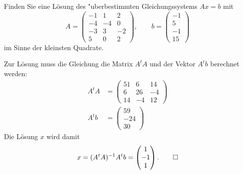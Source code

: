 Finden Sie eine Lösung des "uberbestimmten Gleichungssystems $Ax=b$ mit 
\[
A=\begin{pmatrix}
-1& 1& 2\\
-4&-4& 0\\
-3& 3&-2\\
 5& 0& 2
\end{pmatrix},
\qquad
b=\begin{pmatrix}
-1\\5\\-1\\15
\end{pmatrix}
\]
im Sinne der kleinsten Quadrate.


\begin{loesung}
Zur Lösung muss die Gleichung die Matrix $A^tA$ und der Vektor $A^tb$
berechnet werden:
\begin{align*}
A^tA
&=
\begin{pmatrix}
   51 &  6 & 14 \\
    6 & 26 & -4 \\
   14 & -4 & 12
\end{pmatrix}
\\
A^tb
&=
\begin{pmatrix}
59\\-24\\30
\end{pmatrix}
\end{align*}
Die Lösung $x$ wird damit
\[
x
=
(A^tA)^{-1} A^tb
=
\begin{pmatrix} 1\\-1\\1 \end{pmatrix}.\qedhere
\]
\end{loesung}


